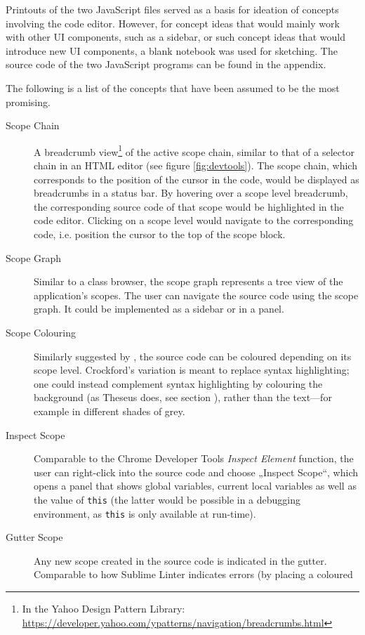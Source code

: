 Printouts of the two JavaScript files served as a basis for ideation of
concepts involving the code editor. However, for concept ideas that
would mainly work with other UI components, such as a sidebar, or such
concept ideas that would introduce new UI components, a blank notebook
was used for sketching. The source code of the two JavaScript programs
can be found in the appendix.

The following is a list of the concepts that have been assumed to be the
most promising.

\begin{description}
\item[Scope Chain]
A breadcrumb
view\footnote{In the Yahoo Design Pattern Library: \url{https://developer.yahoo.com/ypatterns/navigation/breadcrumbs.html}}
of the active scope chain, similar to that of a selector chain in an
HTML editor (see figure \ref{fig:devtools}). The scope chain, which
corresponds to the position of the cursor in the code, would be
displayed as \gls{breadcrumbs} in a status bar. By hovering over a scope
level breadcrumb, the corresponding source code of that scope would be
highlighted in the code editor. Clicking on a scope level would navigate
to the corresponding code, i.e. position the cursor to the top of the
scope block.
\item[Scope Graph]
Similar to a class browser, the scope graph represents a tree view of
the application’s scopes. The user can navigate the source code using
the scope graph. It could be implemented as a sidebar or in a panel.
\item[Scope Colouring]
Similarly suggested by , the source code can be
coloured depending on its scope level. Crockford’s variation is meant to
replace syntax highlighting; one could instead complement syntax
highlighting by colouring the background (as Theseus does, see section
), rather than the text—for example in different shades
of grey.
\item[Inspect Scope]
Comparable to the Chrome Developer Tools \emph{Inspect Element}
function, the user can right-click into the source code and choose
„Inspect Scope“, which opens a panel that shows global variables,
current local variables as well as the value of \texttt{this} (the
latter would be possible in a debugging environment, as \texttt{this} is
only available at run-time).
\item[Gutter Scope]
Any new scope created in the source code is indicated in the gutter.
Comparable to how Sublime Linter indicates errors (by placing a coloured

\end{description}
